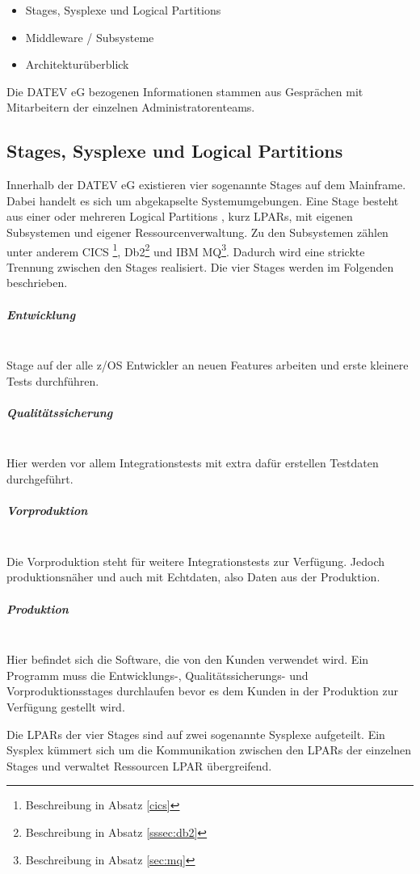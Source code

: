 \begin{samepage}
\begin{itemize}
\item Stages, Sysplexe und Logical Partitions
\item Middleware / Subsysteme
\item Architekturüberblick
\end{itemize}
\end{samepage}

Die DATEV eG bezogenen Informationen stammen aus Gesprächen mit Mitarbeitern der einzelnen Administratorenteams.

\subsection{Stages, Sysplexe und Logical Partitions}\label{sec:sysplex}
Innerhalb der DATEV eG existieren vier sogenannte \glqq Stages\grqq{} auf dem Mainframe.
Dabei handelt es sich um abgekapselte Systemumgebungen.
Eine Stage besteht aus einer oder mehreren \glqq Logical Partitions \grqq, kurz LPARs, mit eigenen Subsystemen und eigener Ressourcenverwaltung. 
Zu den Subsystemen zählen unter anderem CICS \footnote{Beschreibung in Absatz \ref{cics}},  Db2\footnote{Beschreibung in Absatz \ref{sssec:db2}} und IBM MQ\footnote{Beschreibung in Absatz \ref{sec:mq}}.
Dadurch wird eine strickte Trennung zwischen den Stages realisiert.
Die vier Stages werden im Folgenden beschrieben.

\subparagraph{\glqq Entwicklung\grqq}~\\
Stage auf der alle z/OS Entwickler an neuen Features arbeiten und erste kleinere Tests durchführen.

\subparagraph{\glqq Qualitätssicherung\grqq} ~\\
Hier werden vor allem Integrationstests mit extra dafür erstellen Testdaten durchgeführt.

\subparagraph{\glqq Vorproduktion\grqq}~\\
Die Vorproduktion steht für weitere Integrationstests zur Verfügung.
Jedoch produktionsnäher und auch mit Echtdaten, also Daten aus der Produktion.

\subparagraph{\glqq Produktion\grqq}~\\
Hier befindet sich die Software, die von den Kunden verwendet wird.
Ein Programm muss die Entwicklungs-, Qualitätssicherungs- und Vorproduktionsstages durchlaufen bevor es dem Kunden in der Produktion zur Verfügung gestellt wird.

Die LPARs der vier Stages sind auf zwei sogenannte  \glqq Sysplexe\grqq{} aufgeteilt.
Ein Sysplex kümmert sich um die Kommunikation zwischen den LPARs der einzelnen Stages und verwaltet Ressourcen LPAR übergreifend.
\cite{Kyne.2016}

